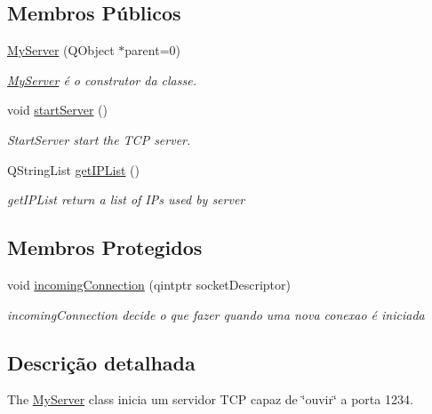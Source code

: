 \subsection*{Membros Públicos}
\begin{DoxyCompactItemize}
\item 
\mbox{\hyperlink{class_my_server_ac9e5ca7b551a5df90d5b39260f7e5404}{My\+Server}} (Q\+Object $\ast$parent=0)
\begin{DoxyCompactList}\small\item\em \mbox{\hyperlink{class_my_server}{My\+Server}} é o construtor da classe. \end{DoxyCompactList}\item 
void \mbox{\hyperlink{class_my_server_a962f0e205a0aaf08b12d50d1315a8c90}{start\+Server}} ()
\begin{DoxyCompactList}\small\item\em Start\+Server start the T\+CP server. \end{DoxyCompactList}\item 
Q\+String\+List \mbox{\hyperlink{class_my_server_ac10d498dcc2b5d691f131f17b6602a59}{get\+I\+P\+List}} ()
\begin{DoxyCompactList}\small\item\em get\+I\+P\+List return a list of I\+Ps used by server \end{DoxyCompactList}\end{DoxyCompactItemize}
\subsection*{Membros Protegidos}
\begin{DoxyCompactItemize}
\item 
void \mbox{\hyperlink{class_my_server_a635c7a1e6817285ffb1a2a3842df010b}{incoming\+Connection}} (qintptr socket\+Descriptor)
\begin{DoxyCompactList}\small\item\em incoming\+Connection decide o que fazer quando uma nova conexao é iniciada \end{DoxyCompactList}\end{DoxyCompactItemize}


\subsection{Descrição detalhada}
The \mbox{\hyperlink{class_my_server}{My\+Server}} class inicia um servidor T\+CP capaz de \char`\"{}ouvir\char`\"{} a porta 1234. 

